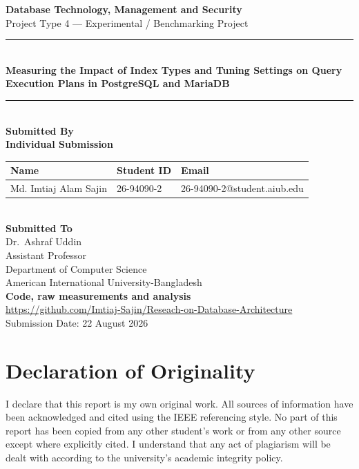 \documentclass[12pt, a4paper]{article}
\newcommand{\CourseName}{Database Technology, Management and Security}
\newcommand{\ReportTitle}{Measuring the Impact of Index Types and Tuning Settings on Query Execution Plans in PostgreSQL and MariaDB}
\newcommand{\ProjectType}{Project Type 4 --- Experimental / Benchmarking Project}
\newcommand{\GroupNumber}{Individual Submission}
\newcommand{\SubmissionDate}{22 August 2026}
\newcommand{\InstructorName}{Dr.\ Ashraf Uddin}
\newcommand{\InstructorTitle}{Assistant Professor}
\newcommand{\InstructorDept}{Department of Computer Science}
\newcommand{\InstructorInstitution}{American International University-Bangladesh}
\begin{document}
\begin{titlepage}
    \centering
    \vspace*{1.2cm}

    {\large \textbf{\CourseName}}\\[0.4cm]
    {\large \ProjectType}\\[1.6cm]

    \rule{\linewidth}{0.5mm}\\[0.6cm]
    {\LARGE \textbf{\ReportTitle}}\\[0.4cm]
    \rule{\linewidth}{0.5mm}\\[1.4cm]

    {\large \textbf{Submitted By}}\\[0.4cm]
    {\large \textbf{\GroupNumber}}\\[0.5cm]

    \begin{tabular}{@{}lll@{}}
        \toprule
        \textbf{Name} & \textbf{Student ID} & \textbf{Email} \\
        \midrule
        Md. Imtiaj Alam Sajin & 26-94090-2 & \small 26-94090-2@student.aiub.edu \\
        \bottomrule
    \end{tabular}\\[1.4cm]

    {\large \textbf{Submitted To}}\\[0.4cm]
    {\large \InstructorName}\\[0.15cm]
    \InstructorTitle\\[0.15cm]
    \InstructorDept\\[0.15cm]
    \InstructorInstitution\\[0.9cm]

    \vfill
    {\large \textbf{Code, raw measurements and analysis}}\\[0.25cm]
    {\small\url{https://github.com/Imtiaj-Sajin/Reseach-on-Database-Architecture}}\\[0.7cm]

    {\large Submission Date: \SubmissionDate}\\[0.4cm]
\end{titlepage}

\section*{Declaration of Originality}
I declare that this report is my own original work. All sources of
information have been acknowledged and cited using the IEEE referencing
style. No part of this report has been copied from any other student's
work or from any other source except where explicitly cited. I
understand that any act of plagiarism will be dealt with according to
the university's academic integrity policy.
\end{document}
